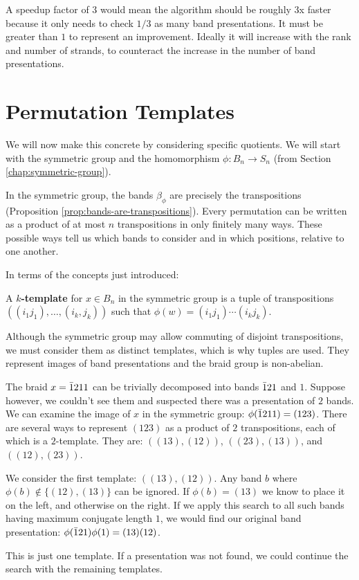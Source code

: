 \documentclass[12pt]{thesis}
\begin{document}
A speedup factor of $3$ would mean
the algorithm should be roughly 3x faster because it only needs to check $1/3$ as many
band presentations.
It must be greater than $1$ to represent an improvement.
Ideally it will increase with the rank
and number of strands, to counteract the increase
in the number of band presentations.

\section{Permutation Templates}

We will now make this concrete by considering specific quotients.
We will start with the symmetric group and the homomorphism $\phi \colon B_{n} \rightarrow S_{n}$
(from Section \ref{chap:symmetric-group}).

In the symmetric group, the bands $\beta_{\phi}$
are precisely the transpositions (Proposition \ref{prop:bands-are-transpositions}).
Every permutation can be written as a product of at most $n$ transpositions
in only finitely many ways.
These possible ways tell us which bands to consider
and in which positions, relative to one another.

In terms of the concepts just introduced:
\begin{definition}
    A \textbf{$k$-template}
    for $x \in B_{n}$ in the symmetric group is a tuple of transpositions $((i_{1} j_{1}), \ldots, (i_{k}, j_{k}))$ such that
$\phi(w) = (i_{1} j_{1}) \cdots (i_{k} j_{k})$.
\end{definition}
Although the symmetric group may allow commuting of disjoint transpositions, we must consider
them as distinct templates, which is why tuples are used.
They represent images of band presentations and the braid group is non-abelian.

\begin{example}
    The braid $x = \bar{1} 2 1 1$ can be trivially decomposed into bands $\bar{1} 2 1$ and $1$.
    Suppose however, we couldn't see them and suspected there
was a presentation of $2$ bands.
We can examine the image of $x$ in the symmetric group:
    $\phi(\bar{1} 2 1 1) = (123)$.
There are several ways to represent $(123)$ as a product of $2$ transpositions,
each of which is a $2$-template.
    They are: $((13), (12))$, $((23), (13))$, and $((12), (23))$.

    We consider the first template: $((13), (12))$.
Any band $b$ where $\phi(b) \not\in \{ (12), (13) \}$ can be ignored.
 If $\phi(b) = (13)$ we know to place it on the left,
and otherwise on the right.
If we apply this search to all such bands having maximum conjugate length $1$,
    we would find our original band presentation: $\phi(\bar{1} 2 1)\phi(1) = (13)(12)$.

This is just one template.
If a presentation was not found, we could continue the search with the remaining templates.
\end{example}
\end{document}
